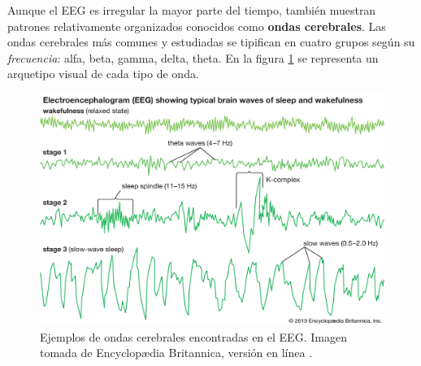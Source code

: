 Aunque el EEG es irregular la mayor parte del tiempo, también muestran patrones relativamente 
organizados conocidos como \textbf{ondas cerebrales}. 
%
Las ondas cerebrales más comunes y estudiadas se tipifican en cuatro grupos según su 
\textit{frecuencia}: alfa, beta, gamma, delta, theta.
%
En la figura \ref{ritmos} se representa un arquetipo visual de cada tipo de onda.

\begin{figure}
\centering
\includegraphics[width=0.95\linewidth]{./img_diagramas/ondas_britannica.jpg} 
\caption[Ejemplos de ondas cerebrales encontradas en el EEG]
{Ejemplos de ondas cerebrales encontradas en el EEG. Imagen tomada de Encyclop{\ae}dia Britannica, 
versión en línea \cite{Britannica}.}
\label{ritmos}
\end{figure}

